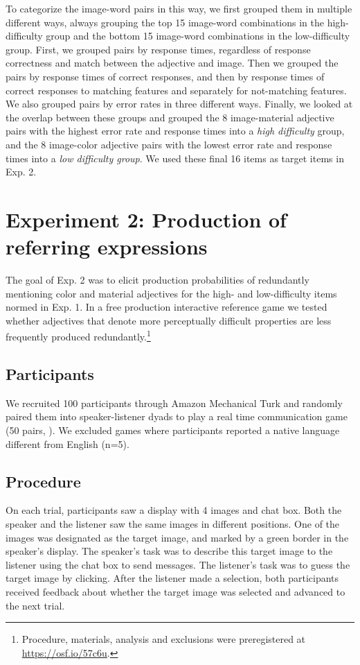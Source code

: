 \documentclass[12pt,letterpaper]{article}
\begin{document}
To categorize the image-word pairs in this way, we first grouped them in multiple different ways, always grouping the top 15 image-word combinations in the high-difficulty group and the bottom 15 image-word combinations in the low-difficulty group. First, we grouped pairs by response times, regardless of response correctness and match between the adjective and image. Then we grouped the pairs by response times of correct responses, and then by response times of correct responses to matching features and separately for not-matching features. We also grouped pairs by error rates in three different ways. Finally, we looked at the overlap between these groups and grouped the 8 image-material adjective pairs with the highest error rate and response times into a \textit{high difficulty} group, and the 8 image-color adjective pairs with the lowest error rate and response times into a \textit{low difficulty group}. We used these final 16 items as target items in Exp. 2.

\section{Experiment 2: Production of referring expressions} 

The goal of Exp. 2 was to elicit production probabilities of redundantly mentioning color and material adjectives for the high- and low-difficulty items normed in Exp. 1. In a free production interactive reference game we tested whether adjectives that denote more perceptually difficult properties are less frequently produced redundantly.\footnote{Procedure, materials, analysis and exclusions were preregistered at \href {https://osf.io/57c6u}{https://osf.io/57c6u}.}

\subsection{Participants} 

We recruited 100 participants through Amazon Mechanical Turk and randomly paired them into speaker-listener dyads to play a real time communication game (50 pairs, \citealt{Hawkins2015}). We excluded games where participants reported a native language different from English (n=5).

\subsection{Procedure} 

On each trial, participants saw a display with 4 images and chat box. Both the speaker and the listener saw the same images in different positions. One of the images was designated as the target image, and marked by a green border in the speaker's display. The speaker's task was to describe this target image to the listener using the chat box to send messages. The listener's task was to guess the target image by clicking. After the listener made a selection, both participants received feedback about whether the target image was selected and advanced to the next trial. 
\end{document}
